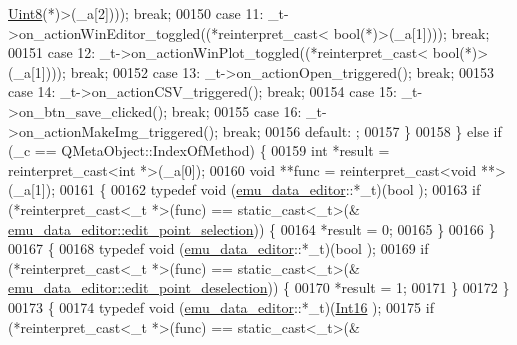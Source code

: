 \begin{DoxyCode}
      \hyperlink{a00004_a979e3e23b9a449e69ab6a8a83b6042f8}{Uint8}(*)\textcolor{keyword}{>}(\_a[2]))); \textcolor{keywordflow}{break};
00150         \textcolor{keywordflow}{case} 11: \_t->on\_actionWinEditor\_toggled((*\textcolor{keyword}{reinterpret\_cast<} \textcolor{keywordtype}{bool}(*)\textcolor{keyword}{>}(\_a[1]))); \textcolor{keywordflow}{break};
00151         \textcolor{keywordflow}{case} 12: \_t->on\_actionWinPlot\_toggled((*\textcolor{keyword}{reinterpret\_cast<} \textcolor{keywordtype}{bool}(*)\textcolor{keyword}{>}(\_a[1]))); \textcolor{keywordflow}{break};
00152         \textcolor{keywordflow}{case} 13: \_t->on\_actionOpen\_triggered(); \textcolor{keywordflow}{break};
00153         \textcolor{keywordflow}{case} 14: \_t->on\_actionCSV\_triggered(); \textcolor{keywordflow}{break};
00154         \textcolor{keywordflow}{case} 15: \_t->on\_btn\_save\_clicked(); \textcolor{keywordflow}{break};
00155         \textcolor{keywordflow}{case} 16: \_t->on\_actionMakeImg\_triggered(); \textcolor{keywordflow}{break};
00156         \textcolor{keywordflow}{default}: ;
00157         \}
00158     \} \textcolor{keywordflow}{else} \textcolor{keywordflow}{if} (\_c == QMetaObject::IndexOfMethod) \{
00159         \textcolor{keywordtype}{int} *result = \textcolor{keyword}{reinterpret\_cast<}\textcolor{keywordtype}{int} *\textcolor{keyword}{>}(\_a[0]);
00160         \textcolor{keywordtype}{void} **func = \textcolor{keyword}{reinterpret\_cast<}\textcolor{keywordtype}{void} **\textcolor{keyword}{>}(\_a[1]);
00161         \{
00162             \textcolor{keyword}{typedef} void (\hyperlink{a00008}{emu\_data\_editor}::*\_t)(bool );
00163             \textcolor{keywordflow}{if} (*reinterpret\_cast<\_t *>(func) == \textcolor{keyword}{static\_cast<}\_t\textcolor{keyword}{>}(&
      \hyperlink{a00008_a9aa2af0c329358fd96f7fb6b7f02bfe1}{emu\_data\_editor::edit\_point\_selection})) \{
00164                 *result = 0;
00165             \}
00166         \}
00167         \{
00168             \textcolor{keyword}{typedef} void (\hyperlink{a00008}{emu\_data\_editor}::*\_t)(bool );
00169             \textcolor{keywordflow}{if} (*reinterpret\_cast<\_t *>(func) == \textcolor{keyword}{static\_cast<}\_t\textcolor{keyword}{>}(&
      \hyperlink{a00008_a2b9629d20c2b97c01bf8486c89fd0148}{emu\_data\_editor::edit\_point\_deselection})) \{
00170                 *result = 1;
00171             \}
00172         \}
00173         \{
00174             \textcolor{keyword}{typedef} void (\hyperlink{a00008}{emu\_data\_editor}::*\_t)(\hyperlink{a00004_a3985266aecb120f269789241c170850c}{Int16} );
00175             \textcolor{keywordflow}{if} (*reinterpret\_cast<\_t *>(func) == \textcolor{keyword}{static\_cast<}\_t\textcolor{keyword}{>}(&

\end{DoxyCode}
